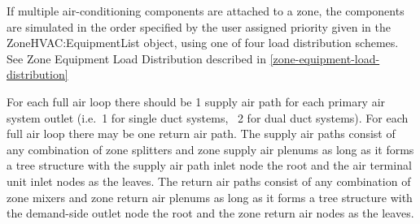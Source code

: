 If multiple air-conditioning components are attached to a zone, the components are simulated in the order specified by the user assigned priority given in the ZoneHVAC:EquipmentList object, using one of four load distribution schemes. See Zone Equipment Load Distribution described in \ref{zone-equipment-load-distribution}

For each full air loop there should be 1 supply air path for each primary air system outlet (i.e.~1 for single duct systems,~ 2 for dual duct systems). For each full air loop there may be one return air path. The supply air paths consist of any combination of zone splitters and zone supply air plenums as long as it forms a tree structure with the supply air path inlet node the root and the air terminal unit inlet nodes as the leaves. The return air paths consist of any combination of zone mixers and zone return air plenums as long as it forms a tree structure with the demand-side outlet node the root and the zone return air nodes as the leaves.

